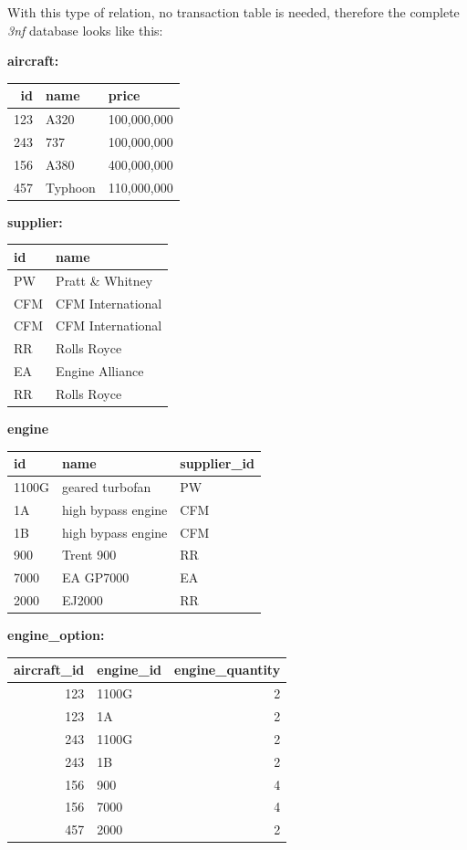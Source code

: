 \documentclass[9pt]{article}
\begin{document}
With this type of relation, no transaction table is needed, therefore the complete \emph{3nf} database looks like this:

\textbf{aircraft:}

\begin{center}
\begin{tabular}{rll}
\hline
id & name & price\\
\hline
123 & A320 & 100,000,000\\
243 & 737 & 100,000,000\\
156 & A380 & 400,000,000\\
457 & Typhoon & 110,000,000\\
\hline
\end{tabular}
\end{center}

\textbf{supplier:}

\begin{center}
\begin{tabular}{ll}
\hline
id & name\\
\hline
PW & Pratt \& Whitney\\
CFM & CFM International\\
CFM & CFM International\\
RR & Rolls Royce\\
EA & Engine Alliance\\
RR & Rolls Royce\\
\hline
\end{tabular}
\end{center}

\textbf{engine}

\begin{center}
\begin{tabular}{lll}
\hline
id & name & supplier\_id\\
\hline
1100G & geared turbofan & PW\\
1A & high bypass engine & CFM\\
1B & high bypass engine & CFM\\
900 & Trent 900 & RR\\
7000 & EA GP7000 & EA\\
2000 & EJ2000 & RR\\
\hline
\end{tabular}
\end{center}

\textbf{engine\_option:}

\begin{center}
\begin{tabular}{rlr}
\hline
aircraft\_id & engine\_id & engine\_quantity\\
\hline
123 & 1100G & 2\\
123 & 1A & 2\\
243 & 1100G & 2\\
243 & 1B & 2\\
156 & 900 & 4\\
156 & 7000 & 4\\
457 & 2000 & 2\\
\hline
\end{tabular}
\end{center}
\end{document}
